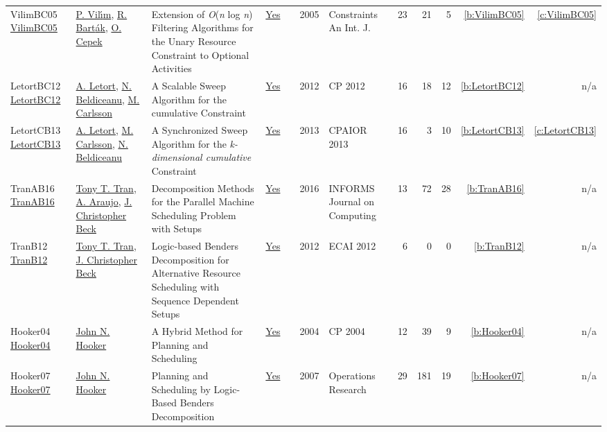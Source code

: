 {\begin{longtable}{>{\raggedright\arraybackslash}p{3cm}>{\raggedright\arraybackslash}p{6cm}>{\raggedright\arraybackslash}p{6.5cm}rrrp{2.5cm}rrrrr}
VilimBC05 \href{https://doi.org/10.1007/s10601-005-2814-0}{VilimBC05} & \hyperref[auth:a121]{P. Vil{\'{\i}}m}, \hyperref[auth:a153]{R. Bart{\'{a}}k}, \hyperref[auth:a162]{O. Cepek} & Extension of \emph{O}(\emph{n} log \emph{n}) Filtering Algorithms for the Unary Resource Constraint to Optional Activities & \href{../works/VilimBC05.pdf}{Yes} & \cite{VilimBC05} & 2005 & Constraints An Int. J. & 23 & 21 & 5 & \ref{b:VilimBC05} & \ref{c:VilimBC05}\\
LetortBC12 \href{https://doi.org/10.1007/978-3-642-33558-7_33}{LetortBC12} & \hyperref[auth:a128]{A. Letort}, \hyperref[auth:a129]{N. Beldiceanu}, \hyperref[auth:a91]{M. Carlsson} & A Scalable Sweep Algorithm for the cumulative Constraint & \href{../works/LetortBC12.pdf}{Yes} & \cite{LetortBC12} & 2012 & CP 2012 & 16 & 18 & 12 & \ref{b:LetortBC12} & n/a\\
LetortCB13 \href{https://doi.org/10.1007/978-3-642-38171-3_10}{LetortCB13} & \hyperref[auth:a128]{A. Letort}, \hyperref[auth:a91]{M. Carlsson}, \hyperref[auth:a129]{N. Beldiceanu} & A Synchronized Sweep Algorithm for the \emph{k-dimensional cumulative} Constraint & \href{../works/LetortCB13.pdf}{Yes} & \cite{LetortCB13} & 2013 & CPAIOR 2013 & 16 & 3 & 10 & \ref{b:LetortCB13} & \ref{c:LetortCB13}\\
TranAB16 \href{https://doi.org/10.1287/ijoc.2015.0666}{TranAB16} & \hyperref[auth:a802]{Tony T. Tran}, \hyperref[auth:a810]{A. Araujo}, \hyperref[auth:a89]{J. Christopher Beck} & Decomposition Methods for the Parallel Machine Scheduling Problem with Setups & \href{../works/TranAB16.pdf}{Yes} & \cite{TranAB16} & 2016 & INFORMS Journal on Computing & 13 & 72 & 28 & \ref{b:TranAB16} & n/a\\
TranB12 \href{https://doi.org/10.3233/978-1-61499-098-7-774}{TranB12} & \hyperref[auth:a802]{Tony T. Tran}, \hyperref[auth:a89]{J. Christopher Beck} & Logic-based Benders Decomposition for Alternative Resource Scheduling with Sequence Dependent Setups & \href{../works/TranB12.pdf}{Yes} & \cite{TranB12} & 2012 & ECAI 2012 & 6 & 0 & 0 & \ref{b:TranB12} & n/a\\
Hooker04 \href{https://doi.org/10.1007/978-3-540-30201-8_24}{Hooker04} & \hyperref[auth:a161]{John N. Hooker} & A Hybrid Method for Planning and Scheduling & \href{../works/Hooker04.pdf}{Yes} & \cite{Hooker04} & 2004 & CP 2004 & 12 & 39 & 9 & \ref{b:Hooker04} & n/a\\
Hooker07 \href{http://dx.doi.org/10.1287/opre.1060.0371}{Hooker07} & \hyperref[auth:a161]{John N. Hooker} & Planning and Scheduling by Logic-Based Benders Decomposition & \href{../works/Hooker07.pdf}{Yes} & \cite{Hooker07} & 2007 & Operations Research & 29 & 181 & 19 & \ref{b:Hooker07} & n/a\\

\end{longtable}}
